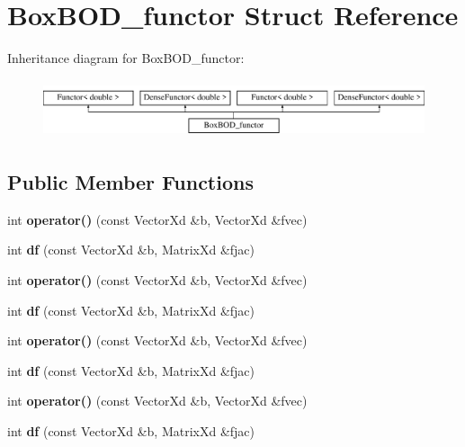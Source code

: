 \hypertarget{struct_box_b_o_d__functor}{}\section{Box\+B\+O\+D\+\_\+functor Struct Reference}
\label{struct_box_b_o_d__functor}
Inheritance diagram for Box\+B\+O\+D\+\_\+functor\+:\begin{figure}[H]
\begin{center}
\leavevmode
\includegraphics[height=1.728395cm]{struct_box_b_o_d__functor}
\end{center}
\end{figure}
\subsection*{Public Member Functions}
\begin{DoxyCompactItemize}
\item 
\mbox{\label{struct_box_b_o_d__functor_ad081cd9736506869048ec28328cd700c}} 
int {\bfseries operator()} (const Vector\+Xd \&b, Vector\+Xd \&fvec)
\item 
\mbox{\label{struct_box_b_o_d__functor_a7c85707a9c70a4df5096de52d2eff439}} 
int {\bfseries df} (const Vector\+Xd \&b, Matrix\+Xd \&fjac)
\item 
\mbox{\label{struct_box_b_o_d__functor_ad081cd9736506869048ec28328cd700c}} 
int {\bfseries operator()} (const Vector\+Xd \&b, Vector\+Xd \&fvec)
\item 
\mbox{\label{struct_box_b_o_d__functor_a7c85707a9c70a4df5096de52d2eff439}} 
int {\bfseries df} (const Vector\+Xd \&b, Matrix\+Xd \&fjac)
\item 
\mbox{\label{struct_box_b_o_d__functor_ad081cd9736506869048ec28328cd700c}} 
int {\bfseries operator()} (const Vector\+Xd \&b, Vector\+Xd \&fvec)
\item 
\mbox{\label{struct_box_b_o_d__functor_a7c85707a9c70a4df5096de52d2eff439}} 
int {\bfseries df} (const Vector\+Xd \&b, Matrix\+Xd \&fjac)
\item 
\mbox{\label{struct_box_b_o_d__functor_ad081cd9736506869048ec28328cd700c}} 
int {\bfseries operator()} (const Vector\+Xd \&b, Vector\+Xd \&fvec)
\item 
\mbox{\label{struct_box_b_o_d__functor_a7c85707a9c70a4df5096de52d2eff439}} 
int {\bfseries df} (const Vector\+Xd \&b, Matrix\+Xd \&fjac)
\end{DoxyCompactItemize}
